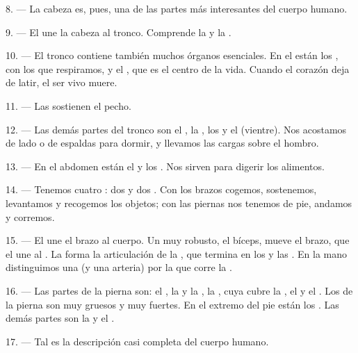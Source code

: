 8. --- La cabeza es, pues, una de las partes más interesantes del cuerpo
humano.

\VUsaut{4.4mm}
\VUsaut{3.0mm}

9. --- El  une la cabeza al tronco. Comprende la
 y la .

10. --- El tronco contiene también muchos órganos esenciales. En el
 están los , con los que respiramos, y el
, que es el centro de la vida. Cuando el corazón deja de
latir, el ser vivo muere.

11. --- Las  sostienen el pecho.

12. --- Las demás partes del tronco son el , la
, los  y el  (vientre). Nos
acostamos de lado o de espaldas para dormir, y llevamos las cargas sobre
el hombro.

13. --- En el abdomen están el  y los .
Nos sirven para digerir los alimentos.

\VUsaut{4.4mm}
\VUsaut{3.0mm}

14. --- Tenemos cuatro : dos  y dos
. Con los brazos cogemos, sostenemos, levantamos y
recogemos los objetos; con las piernas nos tenemos de pie, andamos y
corremos.

15. --- El  une el brazo al cuerpo. Un  muy
robusto, el bíceps, mueve el brazo, que el  une al
. La  forma la articulación de la
, que termina en los  y las . En la
mano distinguimos una  (y una arteria) por la que corre la
.

16. --- Las partes de la pierna son: el , la  y
la , la , cuya  cubre la
, el  y el . Los  de la
pierna son muy gruesos y muy fuertes. En el extremo del pie están los
. Las demás partes son la  y el
.

17. --- Tal es la descripción casi completa del cuerpo humano.

